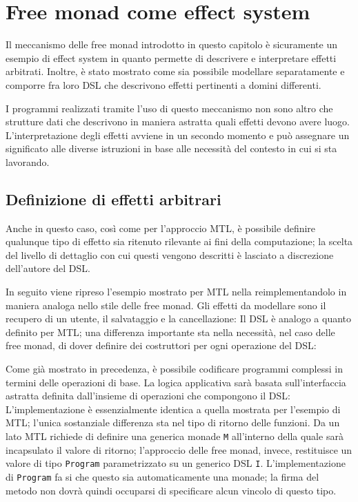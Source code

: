\section{Free monad come effect system}
Il meccanismo delle free monad introdotto in questo capitolo è sicuramente un esempio di effect system in quanto permette di descrivere e interpretare effetti arbitrati. Inoltre, è stato mostrato come sia possibile modellare separatamente e comporre fra loro DSL che descrivono effetti pertinenti a domini differenti.

I programmi realizzati tramite l'uso di questo meccanismo non sono altro che strutture dati che descrivono in maniera astratta quali effetti devono avere luogo. L'interpretazione degli effetti avviene in un secondo momento e può assegnare un significato alle diverse istruzioni in base alle necessità del contesto in cui si sta lavorando.

\subsection{Definizione di effetti arbitrari}
\label{sec:free-effetti-arbitrari}
Anche in questo caso, così come per l'approccio MTL, è possibile definire qualunque tipo di effetto sia ritenuto rilevante ai fini della computazione; la scelta del livello di dettaglio con cui questi vengono descritti è lasciato a discrezione dell'autore del DSL.

In seguito viene ripreso l'esempio mostrato per MTL nella  reimplementandolo in maniera analoga nello stile delle free monad. Gli effetti da modellare sono il recupero di un utente, il salvataggio e la cancellazione:
Il DSL è analogo a quanto definito per MTL; una differenza importante sta nella necessità, nel caso delle free monad, di dover definire dei costruttori per ogni operazione del DSL:

Come già mostrato in precedenza, è possibile codificare programmi complessi in termini delle operazioni di base. La logica applicativa sarà basata sull'interfaccia astratta definita dall'insieme di operazioni che compongono il DSL:
L'implementazione è essenzialmente identica a quella mostrata per l'esempio di MTL; l'unica sostanziale differenza sta nel tipo di ritorno delle funzioni. Da un lato MTL richiede di definire una generica monade \lstinline{M} all'interno della quale sarà incapsulato il valore di ritorno; l'approccio delle free monad, invece, restituisce un valore di tipo \lstinline{Program} parametrizzato su un generico DSL \lstinline{I}.
L'implementazione di \lstinline{Program} fa si che questo sia automaticamente una monade; la firma del metodo non dovrà quindi occuparsi di specificare alcun vincolo di questo tipo.

